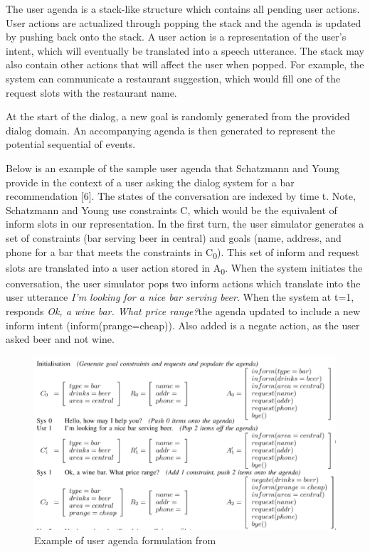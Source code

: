 The user agenda is a stack-like structure which contains all pending user actions. User actions are actualized through popping the stack and the agenda is updated by pushing back onto the stack. A user action is a representation of the user’s intent, which will eventually be translated into a speech utterance. The stack may also contain other actions that will affect the user when popped. For example, the system can communicate a restaurant suggestion, which would fill one of the request slots with the restaurant name.  

At the start of the dialog, a new goal is randomly generated from the provided dialog domain. An accompanying agenda is then generated to represent the potential sequential of events. 

Below is an example of the sample user agenda that Schatzmann and Young provide in the context of a user asking the dialog system for a bar recommendation [6]. The states of the conversation are indexed by time t. Note, Schatzmann and Young use constraints C, which would be the equivalent of inform slots in our representation. In the first turn, the user simulator generates a set of constraints (bar serving beer in central) and goals (name, address, and phone for a bar that meets the constraints in C\textsubscript{0}). This set of inform and request slots are translated into a user action stored in A\textsubscript{0}. When the system initiates the conversation, the user simulator pops two inform actions which translate into the user utterance \textit{I’m looking for a nice bar serving beer}. When the system at t=1, responds \textit{Ok, a wine bar. What price range?}the agenda updated to include a new inform intent (inform(prange=cheap)). Also added is a negate action, as the user asked beer and not wine. 

\begin{figure}[h!]
	\centering
	\includegraphics[scale=.25]{diagrams/ageda_ex2.jpeg}
	\caption{ Example of user agenda formulation from \cite{Schatzmann2009TheHA} }
	\label{fig:speaker_class}
\end{figure}

